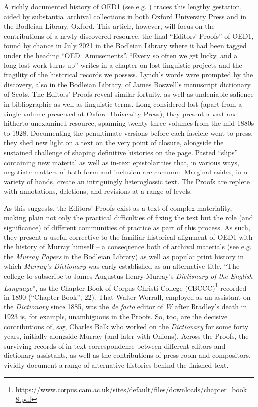 \documentclass[output=paper,colorlinks,citecolor=brown,arabicfont,chinesefont]{langscibook}
\begin{document}
A richly documented history of OED1 (see e.g. \citealt{Brewer2007, Gilliver2016, Mugglestone2005, Murray1977}) traces this lengthy gestation, aided by substantial archival collections in both Oxford University Press and in the Bodleian Library, Oxford. This article, however, will focus on the contributions of a newly-discovered resource, the final “Editors’ Proofs” of OED1, found by chance in July 2021  in the Bodleian Library where it had been tagged under the heading “OED. Amusements”. “Every so often we get lucky, and a long-lost work turns up” writes \citet[158]{Lynch2016} in a chapter on lost linguistic projects and the fragility of the historical records we possess. Lynch’s words were prompted by the discovery, also in the Bodleian Library, of James Boswell’s manuscript dictionary of Scots. The Editors’ Proofs reveal similar fortuity, as well as undeniable salience in bibliographic as well as linguistic terms. Long considered lost (apart from a single volume preserved at Oxford University Press), they present a vast and hitherto unexamined resource, spanning twenty-three volumes from the mid-1880s to 1928. Documenting the penultimate versions before each fascicle went to press, they shed new light on a text on the very point of closure, alongside the sustained challenge of shaping definitive histories on the page. Pasted “slips” containing new material as well as in-text epistolarities that, in various ways, negotiate matters of both form and inclusion are common. Marginal asides, in a variety of hands, create an intriguingly heteroglossic text. The Proofs are replete with annotations, deletions, and revisions at a range of levels.

As this suggests, the Editors’ Proofs exist as a text of complex materiality, making plain not only the practical difficulties of fixing the text but the role (and significance) of different communities of practice as part of this process. As such, they present a useful corrective to the familiar historical alignment of OED1 with the history of Murray himself – a consequence both of archival materials (see e.g. the \textit{Murray Papers} in the Bodleian Library) as well as popular print history in which \textit{Murray’s Dictionary} was early established as an alternative title. “The college to subscribe to James Augustus Henry Murray’s \emph{Dictionary of the English Language}”, as the Chapter Book of Corpus Christi College (CBCCC)\footnote{\url{https://www.corpus.cam.ac.uk/sites/default/files/downloads/chapter_book_8.pdf}} recorded in 1890 (“Chapter Book”, 22). That Walter Worrall, employed as an assistant on the \emph{Dictionary} since 1885, was the \emph{de facto} editor of \emph{W} after Bradley’s death in 1923 is, for example, unambiguous in the Proofs. So, too, are the decisive contributions of, say, Charles Balk who worked on the \emph{Dictionary} for some forty years, initially alongside Murray (and later with Onions). Across the Proofs, the surviving records of in-text correspondence between different editors and dictionary assistants, as well as the contributions of press-room and compositors, vividly document a range of alternative histories behind the finished text. 
\end{document}
